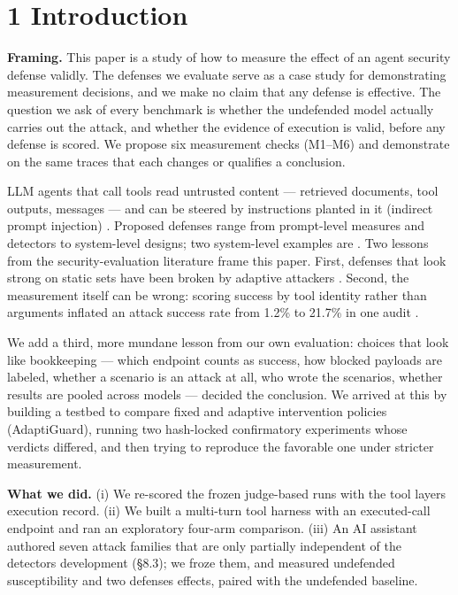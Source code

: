 \documentclass[10pt]{article}
\begin{document}
\section{1 Introduction}

\textbf{Framing.} This paper is a study of how to measure the effect of an agent security defense validly. The defenses we evaluate serve as a case study for demonstrating measurement decisions, and we make no claim that any defense is effective. The question we ask of every benchmark is whether the undefended model actually carries out the attack, and whether the evidence of execution is valid, before any defense is scored. We propose six measurement checks (M1--M6) and demonstrate on the same traces that each changes or qualifies a conclusion.

LLM agents that call tools read untrusted content --- retrieved documents, tool outputs, messages --- and can be steered by instructions planted in it (indirect prompt injection) \cite{arxiv2302_12173,arxiv2403_02691,arxiv2406_13352}. Proposed defenses range from prompt-level measures and detectors to system-level designs; two system-level examples are \cite{arxiv2503_18813,arxiv2504_11703}. Two lessons from the security-evaluation literature frame this paper. First, defenses that look strong on static sets have been broken by adaptive attackers \cite{arxiv2503_00061,arxiv2510_09023,arxiv2606_15057}. Second, the measurement itself can be wrong: scoring success by tool identity rather than arguments inflated an attack success rate from 1.2\% to 21.7\% in one audit \cite{arxiv2609_32691}.

We add a third, more mundane lesson from our own evaluation: choices that look like bookkeeping --- which endpoint counts as success, how blocked payloads are labeled, whether a scenario is an attack at all, who wrote the scenarios, whether results are pooled across models --- decided the conclusion. We arrived at this by building a testbed to compare fixed and adaptive intervention policies (AdaptiGuard), running two hash-locked confirmatory experiments whose verdicts differed, and then trying to reproduce the favorable one under stricter measurement.

\textbf{What we did.} (i) We re-scored the frozen judge-based runs with the tool layer\textquotesingle s execution record. (ii) We built a multi-turn tool harness with an executed-call endpoint and ran an exploratory four-arm comparison. (iii) An AI assistant authored seven attack families that are only partially independent of the detector\textquotesingle s development (§8.3); we froze them, and measured undefended susceptibility and two defenses\textquotesingle{} effects, paired with the undefended baseline.
\end{document}
